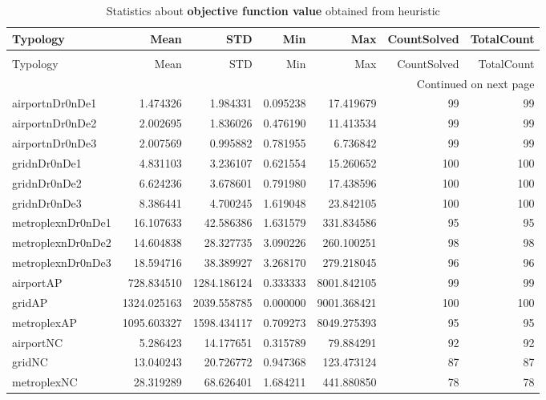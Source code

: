
\begin{longtable}{|l|r|r|r|r|r|r|}
\caption{Statistics about \textbf{objective function value} obtained from heuristic} \label{table:heuristic:results} \\ \hline

Typology & Mean & STD & Min & Max & CountSolved & TotalCount \\ \hline

\endfirsthead
\caption[]{Statistics about \textbf{objective function value} obtained from heuristic} \\ \hline

Typology & Mean & STD & Min & Max & CountSolved & TotalCount \\ \hline

\endhead

\multicolumn{7}{r}{Continued on next page} \\ \hline

\endfoot

\endlastfoot
airportnDr0nDe1 & 1.474326 & 1.984331 & 0.095238 & 17.419679 & 99 & 99 \\ \hline
airportnDr0nDe2 & 2.002695 & 1.836026 & 0.476190 & 11.413534 & 99 & 99 \\ \hline
airportnDr0nDe3 & 2.007569 & 0.995882 & 0.781955 & 6.736842 & 99 & 99 \\ \hline
gridnDr0nDe1 & 4.831103 & 3.236107 & 0.621554 & 15.260652 & 100 & 100 \\ \hline
gridnDr0nDe2 & 6.624236 & 3.678601 & 0.791980 & 17.438596 & 100 & 100 \\ \hline
gridnDr0nDe3 & 8.386441 & 4.700245 & 1.619048 & 23.842105 & 100 & 100 \\ \hline
metroplexnDr0nDe1 & 16.107633 & 42.586386 & 1.631579 & 331.834586 & 95 & 95 \\ \hline
metroplexnDr0nDe2 & 14.604838 & 28.327735 & 3.090226 & 260.100251 & 98 & 98 \\ \hline
metroplexnDr0nDe3 & 18.594716 & 38.389927 & 3.268170 & 279.218045 & 96 & 96 \\ \hline
airportAP & 728.834510 & 1284.186124 & 0.333333 & 8001.842105 & 99 & 99 \\ \hline
gridAP & 1324.025163 & 2039.558785 & 0.000000 & 9001.368421 & 100 & 100 \\ \hline
metroplexAP & 1095.603327 & 1598.434117 & 0.709273 & 8049.275393 & 95 & 95 \\ \hline
airportNC & 5.286423 & 14.177651 & 0.315789 & 79.884291 & 92 & 92 \\ \hline
gridNC & 13.040243 & 20.726772 & 0.947368 & 123.473124 & 87 & 87 \\ \hline
metroplexNC & 28.319289 & 68.626401 & 1.684211 & 441.880850 & 78 & 78 \\ \hline
\end{longtable}
